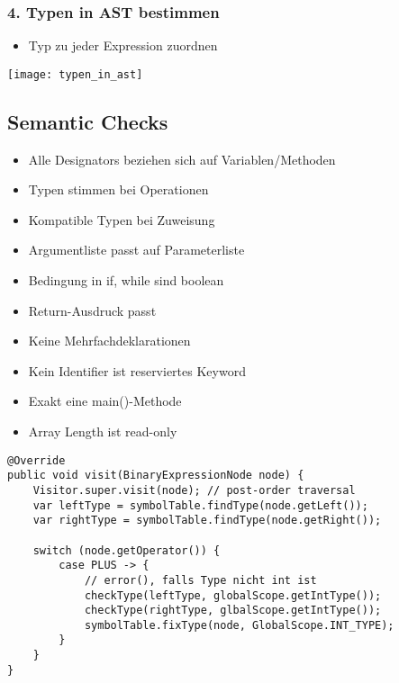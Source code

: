 \begin{minipage}{0,5\linewidth}
    \subsubsection{4. Typen in AST bestimmen}
    \begin{itemize}[topsep=0pt]
        \itemsep -0.2em
        \item Typ zu jeder Expression zuordnen
    \end{itemize}
    \texttt{[image: typen\_in\_ast]}
\end{minipage}

\subsection{Semantic Checks}
\begin{itemize}[topsep=0pt]
    \itemsep -0.2em
    \item Alle Designators beziehen sich auf Variablen/Methoden
    \item Typen stimmen bei Operationen
    \item Kompatible Typen bei Zuweisung
    \item Argumentliste passt auf Parameterliste
    \item Bedingung in if, while sind boolean
    \item Return-Ausdruck passt
    \item Keine Mehrfachdeklarationen
    \item Kein Identifier ist reserviertes Keyword
    \item Exakt eine main()-Methode
    \item Array Length ist read-only
\end{itemize}
\begin{lstlisting}
@Override
public void visit(BinaryExpressionNode node) {
    Visitor.super.visit(node); // post-order traversal
    var leftType = symbolTable.findType(node.getLeft());
    var rightType = symbolTable.findType(node.getRight());

    switch (node.getOperator()) {
        case PLUS -> {
            // error(), falls Type nicht int ist
            checkType(leftType, globalScope.getIntType());
            checkType(rightType, glbalScope.getIntType());
            symbolTable.fixType(node, GlobalScope.INT_TYPE);
        }
    }
}
\end{lstlisting}